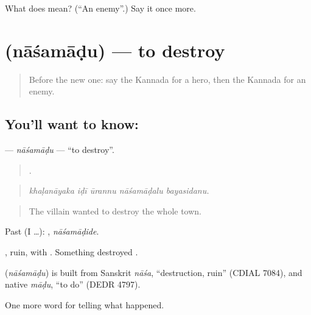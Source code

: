 \begin{tcolorbox}[breakable,colback=teal!4,colframe=teal!35!black,title={Before you move on}]
What does  mean? (\textquotedblleft{}An enemy\textquotedblright{}.) Say it once more.
\end{tcolorbox}
\section[\texorpdfstring{\kn{ನಾಶಮಾಡು} (nāśamāḍu)}{ನಾಶಮಾಡು (nāśamāḍu)}]{ (nāśamāḍu) — to destroy}

\label{lesson:KA-C367-nasamadu}



\begin{quote}
Before the new one: say the Kannada for a hero, then the Kannada for an enemy.
\end{quote}

\subsection*{You'll want to know: }
\textbf{} — \emph{nāśamāḍu} — \textquotedblleft{}to destroy\textquotedblright{}.

\begin{quote}
    .
\end{quote}

\begin{quote}
\emph{khaḷanāyaka iḍī ūrannu nāśamāḍalu bayasidanu.}
\end{quote}

\begin{quote}
The villain wanted to destroy the whole town.
\end{quote}

Past (I …): , \emph{nāśamāḍide}.

, ruin, with . Something destroyed .

\begin{cousinweb}
\textbf{} (\emph{nāśamāḍu}) is built from Sanskrit \emph{nāśa}, \textquotedblleft{}destruction, ruin\textquotedblright{} (CDIAL 7084), and native \emph{māḍu}, \textquotedblleft{}to do\textquotedblright{} (DEDR 4797).
\end{cousinweb}

\begin{grammarlens}[title={What you've built}]
One more word for telling what happened.
\end{grammarlens}

